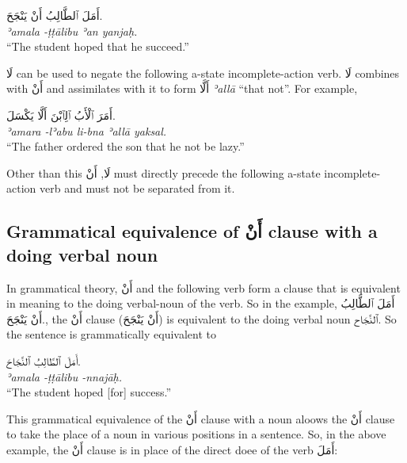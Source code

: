 \documentclass[
  10pt,
]{book}
\begin{document}
\foreignlanguage{arabic}{أَمَلَ ٱلطَّالِبُ أَنْ يَنْجَحَ.}\\
\emph{ʾamala -ṭṭālibu ʾan yanjaḥ.}\\
\enquote{The student hoped that he succeed.}

\foreignlanguage{arabic}{لَا} can be used to negate the following a-state incomplete-action verb.
\foreignlanguage{arabic}{لَا} combines with \foreignlanguage{arabic}{أَنْ} and assimilates with it to form \foreignlanguage{arabic}{أَلَّا} \emph{ʾallā} \enquote{that not}.
For example,

\foreignlanguage{arabic}{أَمَرَ ٱلْأَبُ ٱلِٱبْنَ أَلَّا يَکْسَلَ.}\\
\emph{ʾamara -lʾabu li-bna ʾallā yaksal.}\\
\enquote{The father ordered the son that he not be lazy.}

Other than this \foreignlanguage{arabic}{لَا},
\foreignlanguage{arabic}{أَنْ} must directly precede the following a-state incomplete-action verb and must not be separated from it.

\subsection{\texorpdfstring{Grammatical equivalence of \foreignlanguage{arabic}{أَنْ} clause with a doing verbal noun}{Grammatical equivalence of أَنْ clause with a doing verbal noun}}\label{grammatical-equivalence-of-ux623ux646-clause-with-a-doing-verbal-noun}

In grammatical theory,
\foreignlanguage{arabic}{أَنْ}
and the following verb form a clause that is equivalent in meaning to the doing verbal-noun of the verb. So in the example,
\foreignlanguage{arabic}{أَمَلَ ٱلطَّالِبُ أَنْ يَنْجَحَ.}, the
\foreignlanguage{arabic}{أَنْ} clause
(\foreignlanguage{arabic}{أَنْ يَنْجَحَ})
is equivalent to the doing verbal noun \foreignlanguage{arabic}{ٱلنَّجَاح}.
So the sentence is grammatically equivalent to

\foreignlanguage{arabic}{أَمَلَ ٱلطَّالِبُ ٱلنَّجَاحَ.}\\
\emph{ʾamala -ṭṭālibu -nnajāḥ.}\\
\enquote{The student hoped {[}for{]} success.}

This grammatical equivalence of the
\foreignlanguage{arabic}{أَنْ} clause
with a noun aloows the
\foreignlanguage{arabic}{أَنْ} clause to take the place of a noun in various positions in a sentence.
So, in the above example, the
\foreignlanguage{arabic}{أَنْ} clause
is in place of the direct doee of the verb \foreignlanguage{arabic}{أَمَلَ}:
\end{document}
